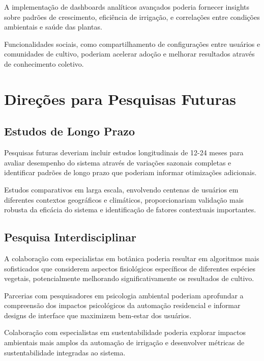 A implementação de dashboards analíticos avançados poderia fornecer insights sobre padrões de crescimento, eficiência de irrigação, e correlações entre condições ambientais e saúde das plantas.

Funcionalidades sociais, como compartilhamento de configurações entre usuários e comunidades de cultivo, poderiam acelerar adoção e melhorar resultados através de conhecimento coletivo.


\section{Direções para Pesquisas Futuras}

\subsection{Estudos de Longo Prazo}

Pesquisas futuras deveriam incluir estudos longitudinais de 12-24 meses para avaliar desempenho do sistema através de variações sazonais completas e identificar padrões de longo prazo que poderiam informar otimizações adicionais.

Estudos comparativos em larga escala, envolvendo centenas de usuários em diferentes contextos geográficos e climáticos, proporcionariam validação mais robusta da eficácia do sistema e identificação de fatores contextuais importantes.

\subsection{Pesquisa Interdisciplinar}

A colaboração com especialistas em botânica poderia resultar em algoritmos mais sofisticados que considerem aspectos fisiológicos específicos de diferentes espécies vegetais, potencialmente melhorando significativamente os resultados de cultivo.

Parcerias com pesquisadores em psicologia ambiental poderiam aprofundar a compreensão dos impactos psicológicos da automação residencial e informar designs de interface que maximizem bem-estar dos usuários.

Colaboração com especialistas em sustentabilidade poderia explorar impactos ambientais mais amplos da automação de irrigação e desenvolver métricas de sustentabilidade integradas ao sistema.


